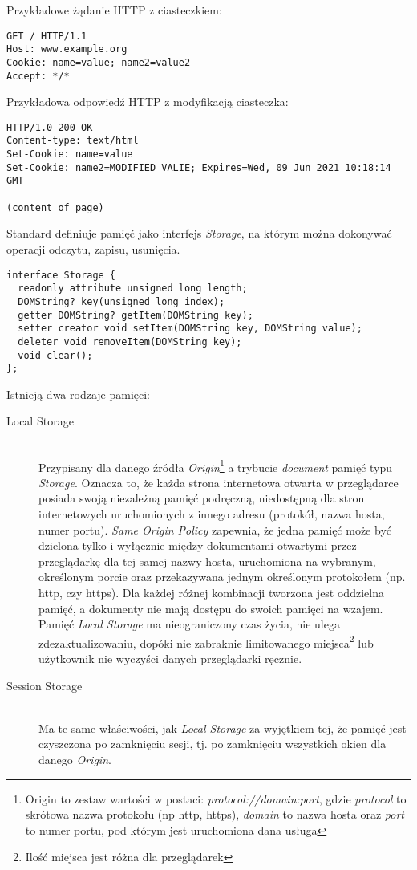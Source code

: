 Przykładowe żądanie HTTP z ciasteczkiem:
\lstset{language=Octave}
\begin{lstlisting}
GET / HTTP/1.1
Host: www.example.org
Cookie: name=value; name2=value2
Accept: */*
\end{lstlisting}

Przykładowa odpowiedź HTTP z modyfikacją ciasteczka:
\lstset{language=Octave}
\begin{lstlisting}
HTTP/1.0 200 OK
Content-type: text/html
Set-Cookie: name=value
Set-Cookie: name2=MODIFIED_VALIE; Expires=Wed, 09 Jun 2021 10:18:14 GMT

(content of page)
\end{lstlisting}

Standard definiuje pamięć jako interfejs \emph{Storage}, na którym można dokonywać operacji odczytu, zapisu, usunięcia.

\lstset{language=Octave}
\begin{lstlisting}
interface Storage {
  readonly attribute unsigned long length;
  DOMString? key(unsigned long index);
  getter DOMString? getItem(DOMString key);
  setter creator void setItem(DOMString key, DOMString value);
  deleter void removeItem(DOMString key);
  void clear();
};
\end{lstlisting}

Istnieją dwa rodzaje pamięci:

\begin{description}
  \item[Local Storage] \hfill \\
  Przypisany dla danego źródła \emph{Origin}\footnote{Origin to zestaw wartości w postaci: \emph{protocol://domain:port}, gdzie \emph{protocol} to skrótowa nazwa protokołu (np http, https), \emph{domain} to nazwa hosta oraz \emph{port} to numer portu, pod którym jest uruchomiona dana usługa} a trybucie \emph{document} pamięć typu \emph{Storage}. Oznacza to, że każda strona internetowa otwarta w przeglądarce posiada swoją niezależną pamięć podręczną, niedostępną dla stron internetowych uruchomionych z innego adresu (protokół, nazwa hosta, numer portu). \emph{Same Origin Policy} zapewnia, że jedna pamięć może być dzielona tylko i wyłącznie między dokumentami otwartymi przez przeglądarkę dla tej samej nazwy hosta, uruchomiona na wybranym, określonym porcie oraz przekazywana jednym określonym protokołem (np. http, czy https). Dla każdej różnej kombinacji tworzona jest oddzielna pamięć, a dokumenty nie mają dostępu do swoich pamięci na wzajem. Pamięć \emph{Local Storage} ma nieograniczony czas życia, nie ulega zdezaktualizowaniu, dopóki nie zabraknie limitowanego miejsca\footnote{Ilość miejsca jest różna dla przeglądarek} lub użytkownik nie wyczyści danych przeglądarki ręcznie.
  \item[Session Storage] \hfill \\
  Ma te same właściwości, jak \emph{Local Storage} za wyjętkiem tej, że pamięć jest czyszczona po zamknięciu sesji, tj. po zamknięciu wszystkich okien dla danego \emph{Origin}.
\end{description}

